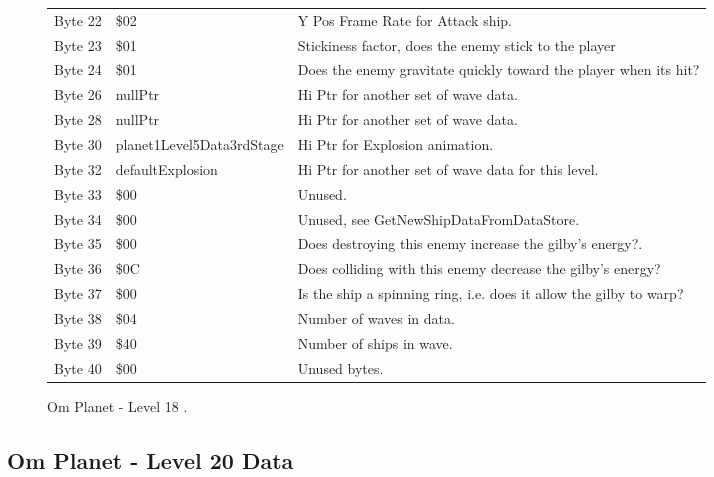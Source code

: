 \begin{figure}[H]
{\begin{adjustbox}{width=12cm}
\begin{tabular}{lll}
 Byte 22 & \$02                       & Y Pos Frame Rate for Attack ship.                                  \\
 Byte 23 & \$01                       & Stickiness factor, does the enemy stick to the player              \\
 Byte 24 & \$01                       & Does the enemy gravitate quickly toward the player when its hit?   \\
 Byte 26 & nullPtr                   & Hi Ptr for another set of wave data.                               \\
 Byte 28 & nullPtr                   & Hi Ptr for another set of wave data.                               \\
 Byte 30 & planet1Level5Data3rdStage & Hi Ptr for Explosion animation.                                    \\
 Byte 32 & defaultExplosion          & Hi Ptr for another set of wave data for this level.                \\
 Byte 33 & \$00                       & Unused.                                                            \\
 Byte 34 & \$00                       & Unused, see GetNewShipDataFromDataStore.                           \\
 Byte 35 & \$00                       & Does destroying this enemy increase the gilby's energy?.           \\
 Byte 36 & \$0C                       & Does colliding with this enemy decrease the gilby's energy?        \\
 Byte 37 & \$00                       & Is the ship a spinning ring, i.e. does it allow the gilby to warp? \\
 Byte 38 & \$04                       & Number of waves in data.                                           \\
 Byte 39 & \$40                       & Number of ships in wave.                                           \\
 Byte 40 & \$00                       & Unused bytes.                                                      \\
\bottomrule
\end{tabular}

  \end{adjustbox}

  }\caption*{Om Planet - Level 18
.}
\end{figure}

\clearpage
\subsection{Om Planet - Level 20 Data}

